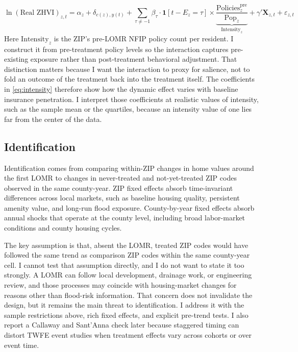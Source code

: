 \documentclass[12pt]{article}
\begin{document}
\begin{equation}\label{eq:intensity}
    \ln(\text{Real ZHVI})_{z,t} = \alpha_z + \delta_{c(z),y(t)} + \sum_{\tau \neq -1} \beta_\tau \cdot \mathbf{1}[t - E_z = \tau] \times \underbrace{\frac{\text{Policies}_z^{\text{pre}}}{\text{Pop}_z}}_{\text{Intensity}_z} + \gamma' \mathbf{X}_{z,t} + \varepsilon_{z,t}
\end{equation}
%
\noindent Here $\text{Intensity}_z$ is the ZIP's pre-LOMR NFIP policy count per resident. I construct it from pre-treatment policy levels so the interaction captures pre-existing exposure rather than post-treatment behavioral adjustment. That distinction matters because I want the interaction to proxy for salience, not to fold an outcome of the treatment back into the treatment itself. The coefficients in \autoref{eq:intensity} therefore show how the dynamic effect varies with baseline insurance penetration. I interpret those coefficients at realistic values of intensity, such as the sample mean or the quartiles, because an intensity value of one lies far from the center of the data.

\subsection{Identification}\label{sec:strategy_identification}

Identification comes from comparing within-ZIP changes in home values around the first LOMR to changes in never-treated and not-yet-treated ZIP codes observed in the same county-year. ZIP fixed effects absorb time-invariant differences across local markets, such as baseline housing quality, persistent amenity value, and long-run flood exposure. County-by-year fixed effects absorb annual shocks that operate at the county level, including broad labor-market conditions and county housing cycles.

The key assumption is that, absent the LOMR, treated ZIP codes would have followed the same trend as comparison ZIP codes within the same county-year cell. I cannot test that assumption directly, and I do not want to state it too strongly. A LOMR can follow local development, drainage work, or engineering review, and those processes may coincide with housing-market changes for reasons other than flood-risk information. That concern does not invalidate the design, but it remains the main threat to identification. I address it with the sample restrictions above, rich fixed effects, and explicit pre-trend tests. I also report a Callaway and Sant'Anna check later because staggered timing can distort TWFE event studies when treatment effects vary across cohorts or over event time.
\end{document}
